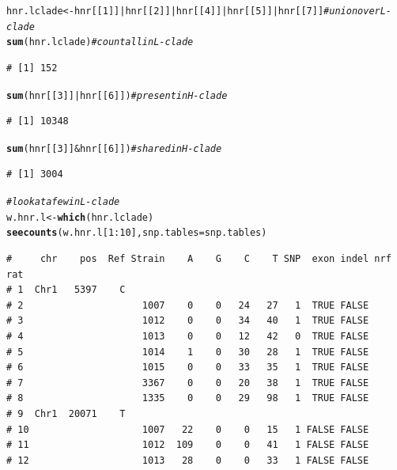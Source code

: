 \documentclass{article}\usepackage[]{graphicx}\usepackage[]{color}
\makeatletter
\newcommand{\hlnum}[1]{\textcolor[rgb]{0.686,0.059,0.569}{#1}}%
\newcommand{\hlcom}[1]{\textcolor[rgb]{0.678,0.584,0.686}{\textit{#1}}}%
\newcommand{\hlopt}[1]{\textcolor[rgb]{0,0,0}{#1}}%
\newcommand{\hlstd}[1]{\textcolor[rgb]{0.345,0.345,0.345}{#1}}%
\newcommand{\hlkwb}[1]{\textcolor[rgb]{0.69,0.353,0.396}{#1}}%
\newcommand{\hlkwc}[1]{\textcolor[rgb]{0.333,0.667,0.333}{#1}}%
\newcommand{\hlkwd}[1]{\textcolor[rgb]{0.737,0.353,0.396}{\textbf{#1}}}%
\newenvironment{kframe}{%
 \def\at@end@of@kframe{}%
 \ifinner\ifhmode%
  \def\at@end@of@kframe{\end{minipage}}%
  \begin{minipage}{\columnwidth}%
 \fi\fi%
 \def\FrameCommand##1{\hskip\@totalleftmargin \hskip-\fboxsep
 \colorbox{shadecolor}{##1}\hskip-\fboxsep
     \hskip-\linewidth \hskip-\@totalleftmargin \hskip\columnwidth}%
 \MakeFramed {\advance\hsize-\width
   \@totalleftmargin\z@ \linewidth\hsize
   \@setminipage}}%
 {\par\unskip\endMakeFramed%
 \at@end@of@kframe}
\newenvironment{knitrout}{}{} %
\makeatother
\begin{document}
\begin{knitrout}
\begin{kframe}
\begin{alltt}
\hlstd{hnr.lclade} \hlkwb{<-} \hlstd{hnr[[}\hlnum{1}\hlstd{]]} \hlopt{|} \hlstd{hnr[[}\hlnum{2}\hlstd{]]} \hlopt{|} \hlstd{hnr[[}\hlnum{4}\hlstd{]]} \hlopt{|} \hlstd{hnr[[}\hlnum{5}\hlstd{]]} \hlopt{|} \hlstd{hnr[[}\hlnum{7}\hlstd{]]}  \hlcom{# union over L-clade}
\hlkwd{sum}\hlstd{(hnr.lclade)}                                                     \hlcom{# count all in L-clade}
\end{alltt}
\begin{verbatim}
# [1] 152
\end{verbatim}
\begin{alltt}
\hlkwd{sum}\hlstd{(hnr[[}\hlnum{3}\hlstd{]]} \hlopt{|} \hlstd{hnr[[}\hlnum{6}\hlstd{]])}                                            \hlcom{# present in H-clade}
\end{alltt}
\begin{verbatim}
# [1] 10348
\end{verbatim}
\begin{alltt}
\hlkwd{sum}\hlstd{(hnr[[}\hlnum{3}\hlstd{]]} \hlopt{&} \hlstd{hnr[[}\hlnum{6}\hlstd{]])}                                            \hlcom{# shared in H-clade}
\end{alltt}
\begin{verbatim}
# [1] 3004
\end{verbatim}
\begin{alltt}
\hlcom{# look at a few in L-clade}
\hlstd{w.hnr.l} \hlkwb{<-} \hlkwd{which}\hlstd{(hnr.lclade)}
\hlkwd{seecounts}\hlstd{(w.hnr.l[}\hlnum{1}\hlopt{:}\hlnum{10}\hlstd{],}\hlkwc{snp.tables}\hlstd{=snp.tables)}
\end{alltt}
\begin{verbatim}
#     chr    pos  Ref Strain    A    G    C    T SNP  exon indel nrf rat
# 1  Chr1   5397    C                                                   
# 2                     1007    0    0   24   27   1  TRUE FALSE        
# 3                     1012    0    0   34   40   1  TRUE FALSE        
# 4                     1013    0    0   12   42   0  TRUE FALSE        
# 5                     1014    1    0   30   28   1  TRUE FALSE        
# 6                     1015    0    0   33   35   1  TRUE FALSE        
# 7                     3367    0    0   20   38   1  TRUE FALSE        
# 8                     1335    0    0   29   98   1  TRUE FALSE        
# 9  Chr1  20071    T                                                   
# 10                    1007   22    0    0   15   1 FALSE FALSE        
# 11                    1012  109    0    0   41   1 FALSE FALSE        
# 12                    1013   28    0    0   33   1 FALSE FALSE        

\end{verbatim}
\end{kframe}
\end{knitrout}
\end{document}
